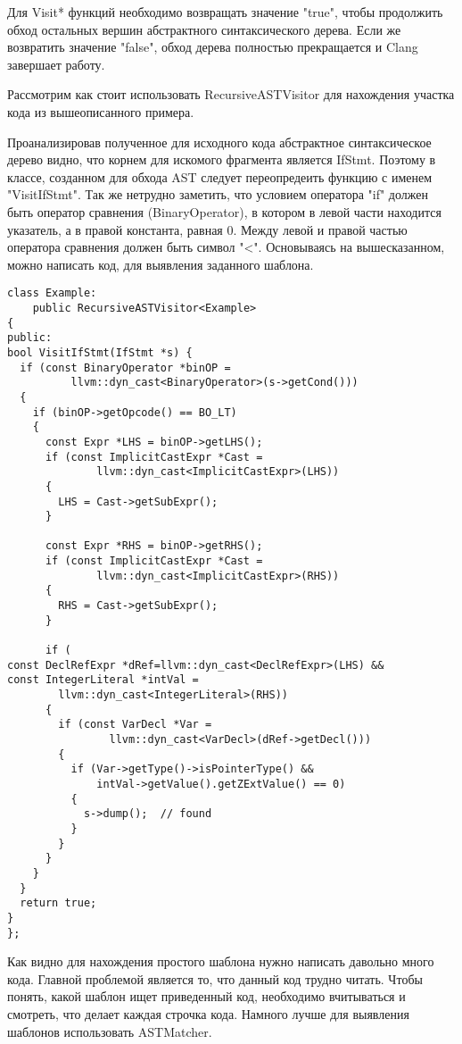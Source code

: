 Для Visit* функций необходимо возвращать значение "true", чтобы продолжить обход остальных вершин
абстрактного синтаксического дерева. Если же возвратить значение "false", обход дерева полностью
прекращается и Clang завершает работу.

Рассмотрим как стоит использовать RecursiveASTVisitor для нахождения участка кода из вышеописанного
примера.

Проанализировав полученное для исходного кода абстрактное синтаксическое дерево видно, что 
корнем для искомого фрагмента является IfStmt. Поэтому в классе, созданном для обхода AST
следует переопредеить функцию с именем "VisitIfStmt". Так же нетрудно заметить, что условием 
оператора "if" должен быть оператор сравнения (BinaryOperator), в котором в левой части
находится указатель, а в правой константа, равная 0. Между левой и правой частью оператора сравнения
должен быть символ "<". Основываясь на вышесказанном, можно написать код, для выявления заданного шаблона.
\begin{lstlisting}
class Example:
	public RecursiveASTVisitor<Example> 
{
public:
bool VisitIfStmt(IfStmt *s) {
  if (const BinaryOperator *binOP =
          llvm::dyn_cast<BinaryOperator>(s->getCond())) 
  {
    if (binOP->getOpcode() == BO_LT) 
    {
      const Expr *LHS = binOP->getLHS();
      if (const ImplicitCastExpr *Cast =
              llvm::dyn_cast<ImplicitCastExpr>(LHS)) 
      {
        LHS = Cast->getSubExpr();
      }
      
      const Expr *RHS = binOP->getRHS();
      if (const ImplicitCastExpr *Cast =
              llvm::dyn_cast<ImplicitCastExpr>(RHS)) 
      {
        RHS = Cast->getSubExpr();
      } 

      if (
const DeclRefExpr *dRef=llvm::dyn_cast<DeclRefExpr>(LHS) &&
const IntegerLiteral *intVal = 
		llvm::dyn_cast<IntegerLiteral>(RHS)) 
	  {
        if (const VarDecl *Var =
                llvm::dyn_cast<VarDecl>(dRef->getDecl())) 
        {
          if (Var->getType()->isPointerType() &&
              intVal->getValue().getZExtValue() == 0) 
          {
            s->dump();  // found
          }
        }
      }
    }
  }
  return true;
}
};
\end{lstlisting}

Как видно для нахождения простого шаблона нужно написать давольно много кода. Главной проблемой 
является то, что данный код трудно читать. Чтобы понять, какой шаблон ищет приведенный код,
необходимо вчитываться и смотреть, что делает каждая строчка кода. Намного лучше для выявления 
шаблонов использовать ASTMatcher.


